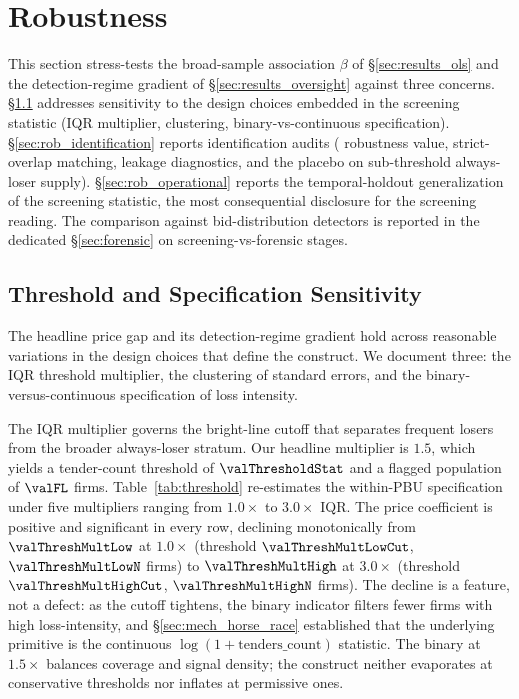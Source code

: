 \section{Robustness}
\label{sec:robustness}

This section stress-tests the broad-sample association $\beta$
of §\ref{sec:results_ols} and the detection-regime gradient of
§\ref{sec:results_oversight} against three concerns.
§\ref{sec:rob_threshold} addresses sensitivity to the design
choices embedded in the screening statistic (IQR multiplier,
clustering, binary-vs-continuous specification).
§\ref{sec:rob_identification} reports identification audits
(\citealt{cinelli2020making} robustness value, strict-overlap
matching, leakage diagnostics, and the placebo on sub-threshold
always-loser supply). §\ref{sec:rob_operational} reports the
temporal-holdout generalization of the screening statistic, the
most consequential disclosure for the screening reading. The
comparison against bid-distribution detectors is reported in the
dedicated §\ref{sec:forensic} on screening-vs-forensic stages.

\subsection{Threshold and Specification Sensitivity}
\label{sec:rob_threshold}

The headline price gap and its detection-regime gradient hold across
reasonable variations in the design choices that define the
construct. We document three: the IQR threshold multiplier, the
clustering of standard errors, and the binary-versus-continuous
specification of loss intensity.

The IQR multiplier governs the bright-line cutoff that separates
frequent losers from the broader always-loser stratum. Our headline
multiplier is $1.5$, which yields a tender-count threshold of
$\valThresholdStat$ and a flagged population of $\valFL$ firms.
Table~\ref{tab:threshold} re-estimates the within-PBU
specification under five multipliers ranging from $1.0\times$ to
$3.0\times$ IQR. The price coefficient is positive and significant
in every row, declining monotonically from $\valThreshMultLow$
at $1.0\!\times$ (threshold $\valThreshMultLowCut$,
$\valThreshMultLowN$ firms) to $\valThreshMultHigh$ at $3.0\!\times$
(threshold $\valThreshMultHighCut$, $\valThreshMultHighN$ firms). The decline is a feature, not a
defect: as the cutoff tightens, the binary indicator filters fewer
firms with high loss-intensity, and §\ref{sec:mech_horse_race}
established that the underlying primitive is the continuous
$\log(1+\text{tenders\_count})$ statistic. The binary at $1.5\times$
balances coverage and signal density;
the construct neither evaporates at conservative thresholds nor
inflates at permissive ones.

